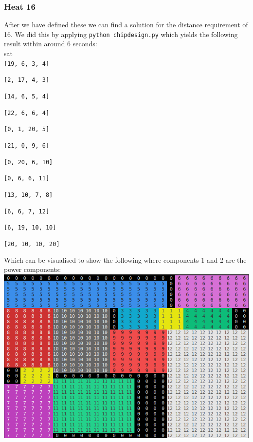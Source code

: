 \documentclass[12pt]{article}
\begin{document}
\subsubsection*{Heat 16}

After we have defined these we can find a solution for the distance requirement of 16. We did this by applying {\tt python chipdesign.py} which yields the following result within around 6 seconds: \\

sat\\

{\tt [19, 6, 3, 4] }

{\tt [2, 17, 4, 3] }

{\tt [14, 6, 5, 4] }

{\tt [22, 6, 6, 4] }

{\tt [0, 1, 20, 5] }

{\tt [21, 0, 9, 6] }

{\tt [0, 20, 6, 10] }

{\tt [0, 6, 6, 11] }

{\tt [13, 10, 7, 8] }

{\tt [6, 6, 7, 12] }

{\tt [6, 19, 10, 10] }

{\tt [20, 10, 10, 20] }

 Which can be visualised to show the following where components 1 and 2 are the power components:\\

\includegraphics[width=\linewidth]{images/chipdesign_heat_16.png}
\end{document}
